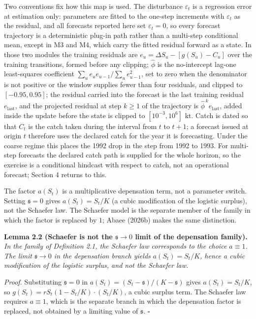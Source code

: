 \documentclass[11pt]{article}
\begin{document}
Two conventions fix how this map is used. The disturbance
\(\varepsilon_t\) is a regression error at estimation only: parameters
are fitted to the one-step increments with \(\varepsilon_t\) as the
residual, and all forecasts reported here set \(\varepsilon_t = 0\), so
every forecast trajectory is a deterministic plug-in path rather than a
multi-step conditional mean, except in M3 and M4, which carry the
fitted residual forward as a state. In those two modules the training
residuals are \(e_u = \Delta S_u - [g(S_u) - C_u]\) over the training
transitions, formed before any clipping; \(\hat\phi\) is the
no-intercept lag-one least-squares coefficient
\(\sum_u e_u e_{u-1}/\sum_u e_{u-1}^2\), set to zero when the
denominator is not positive or the window supplies fewer than four
residuals, and clipped to \([-0.95, 0.95]\); the residual carried into
the forecast is the last training residual \(e_{\mathrm{last}}\), and
the projected residual at step \(k \ge 1\) of the trajectory is
\(\hat\phi^{\,k} e_{\mathrm{last}}\), added inside the update before
the state is clipped to \([10^{-3}, 10^{6}]\) kt.
Catch is dated so that \(C_t\) is the catch taken during the interval
from \(t\) to \(t+1\); a forecast issued at origin \(t\) therefore
uses the declared catch for the year it is forecasting. Under the
coarse regime this places the 1992 drop in the step from 1992 to 1993.
For multi-step forecasts the declared catch path is supplied for the
whole horizon, so the exercise is a conditional hindcast with respect to
catch, not an operational forecast; Section 4 returns to this.

The factor \(a(S_t)\) is a multiplicative depensation term, not a
parameter switch. Setting \(\mathfrak s=0\) gives \(a(S_t)=S_t/K\) (a
cubic modification of the logistic surplus), not the Schaefer law. The
Schaefer model is the separate member of the family in which the factor
is replaced by \(1\); Abaee (2026b) makes the same distinction.

\textbf{Lemma 2.2 (Schaefer is not the \(\mathfrak s\to 0\) limit of the
depensation family).} \emph{In the family of Definition 2.1, the
Schaefer law corresponds to the choice \(a\equiv 1\). The limit
\(\mathfrak s\to 0\) in the depensation branch yields \(a(S_t)=S_t/K\),
hence a cubic modification of the logistic surplus, and not the Schaefer
law.}

\emph{Proof.} Substituting \(\mathfrak s=0\) in
\(a(S_t)=(S_t-\mathfrak s)/(K-\mathfrak s)\) gives \(a(S_t)=S_t/K\), so
\(g(S_t)=rS_t(1-S_t/K)\cdot(S_t/K)\), a cubic surplus term. The Schaefer
law requires \(a\equiv 1\), which is the separate branch in which the
depensation factor is replaced, not obtained by a limiting value of
\(\mathfrak s\). \ensuremath{\square}
\end{document}
